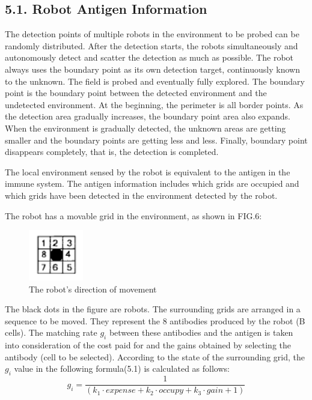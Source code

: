 \documentclass[Proceedings]{ascelike}
\begin{document}
\subsection{5.1. Robot Antigen Information}
The detection points of multiple robots in the environment to be probed can be randomly distributed. After the detection starts, the robots simultaneously and autonomously detect and scatter the detection as much as possible. The robot always uses the boundary point as its own detection target, continuously known to the unknown. The field is probed and eventually fully explored. The boundary point is the boundary point between the detected environment and the undetected environment. At the beginning, the perimeter is all border points. As the detection area gradually increases, the boundary point area also expands. When the environment is gradually detected, the unknown areas are getting smaller and the boundary points are getting less and less. Finally, boundary point disappears completely, that is, the detection is completed.
\par
The local environment sensed by the robot is equivalent to the antigen in the immune system. The antigen information includes which grids are occupied and which grids have been detected in the environment detected by the robot.
\par
The robot has a movable grid in the environment, as shown in FIG.6:
\begin{figure}
\centering
    \includegraphics[scale=0.9] {img/movement_direction.png}
    \caption{The robot's direction of movement}
\end{figure}
\par
The black dots in the figure are robots. The surrounding grids are arranged in a sequence to be moved. They represent the 8 antibodies produced by the robot (B cells). The matching rate \boldmath$g_{i}$ between these antibodies and the antigen is taken into consideration of the cost paid for and the gains obtained by selecting the antibody (cell to be selected). According to the state of the surrounding grid, the \boldmath$g_{i}$ value in the following formula(5.1) is calculated as follows:
\begin{equation}{
    g_{i}=\frac{1}{(k_{1}\cdot expense+k_{2}\cdot occupy+k_{3}\cdot gain+1)}}
\end{equation}
\end{document}
